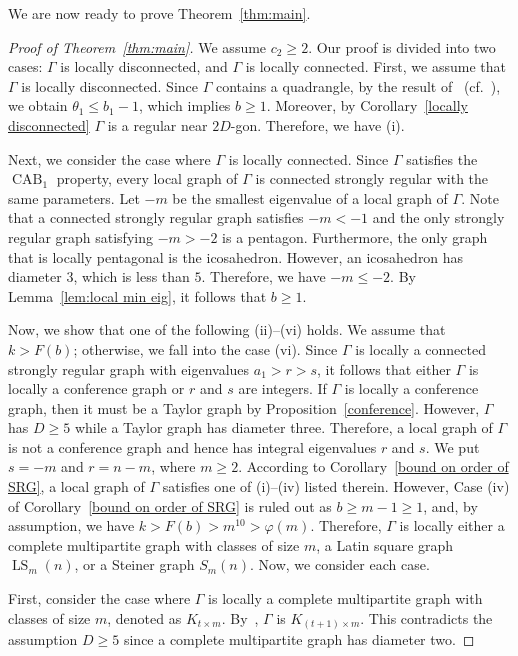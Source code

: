 \documentclass[11pt]{article}
\theoremstyle{definition}
\numberwithin{equation}{section}
\numberwithin{equation}{section}
\begin{document}
We are now ready to prove Theorem~\ref{thm:main}.
\begin{proof}[Proof of Theorem~\ref{thm:main}] 
We assume $c_2\geqslant 2$.
Our proof is divided into two cases: $\Gamma$ is locally disconnected, and $\Gamma$ is locally connected.
First, we assume that $\Gamma$ is locally disconnected.
Since $\Gamma$ contains a quadrangle, by the result of~\cite{Terwilliger1985} (cf.~\cite[p.~170]{BCN}), we obtain $\theta_1 \leqslant b_1-1$, which implies $b \geqslant 1$.
Moreover, by Corollary~\ref{locally disconnected} $\Gamma$ is a regular near $2D$-gon. Therefore, we have (i).

Next, we consider the case where $\Gamma$ is locally connected.
Since $\Gamma$ satisfies the $\operatorname{CAB}_1$ property, every local graph of $\Gamma$ is connected strongly regular with the same parameters.
Let $-m$ be the smallest eigenvalue of a local graph of $\Gamma$. 
Note that a connected strongly regular graph satisfies $-m < -1$ and the only strongly regular graph satisfying $-m > -2$ is a pentagon.
Furthermore, the only graph that is locally pentagonal is the icosahedron.
However, an icosahedron has diameter $3$, which is less than $5$.
Therefore, we have $-m \leqslant -2$. 
By Lemma~\ref{lem:local min eig}, it follows that $b\geqslant 1$.

Now, we show that one of the following (ii)--(vi) holds.
We assume that $k > F(b)$; otherwise, we fall into the case (vi).
Since $\Gamma$ is locally a connected strongly regular graph with eigenvalues $a_1>r>s$, it follows that either $\Gamma$ is locally a conference graph or $r$ and $s$ are integers.
If $\Gamma$ is locally a conference graph, then it must be a Taylor graph by Proposition~\ref{conference}.
However, $\Gamma$ has $D\geqslant 5$ while a Taylor graph has diameter three. 
Therefore, a local graph of $\Gamma$ is not a conference graph and hence has integral eigenvalues $r$ and $s$. 
We put $s=-m$ and $r=n-m$, where $m\geqslant 2$.
According to Corollary~\ref{bound on order of SRG}, a local graph of $\Gamma$ satisfies one of (i)--(iv) listed therein. 
However, Case (iv) of Corollary~\ref{bound on order of SRG} is ruled out as $b \geqslant m-1 \geqslant 1$, and, by assumption, we have $k > F(b) > m^{10} > \varphi(m)$.
Therefore, $\Gamma$ is locally either a complete multipartite graph with classes of size $m$, a Latin square graph $\operatorname{LS}_m(n)$, or a Steiner graph $S_m(n)$.
Now, we consider each case.

First, consider the case where $\Gamma$ is locally a complete multipartite graph with classes of size $m$, denoted as $K_{t \times m}$. 
By~\cite[Proposition 1.1.5]{BCN}, $\Gamma$ is $K_{(t+1) \times m}$. 
This contradicts the assumption $D \geqslant 5$ since a complete multipartite graph has diameter two. 	


\end{proof}
\end{document}
